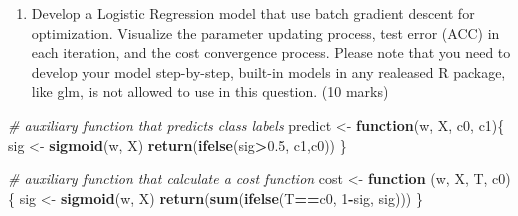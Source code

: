 \documentclass[
]{article}
\newenvironment{Shaded}{\begin{snugshade}}{\end{snugshade}}
\newcommand{\CommentTok}[1]{\textcolor[rgb]{0.56,0.35,0.01}{\textit{#1}}}
\newcommand{\ControlFlowTok}[1]{\textcolor[rgb]{0.13,0.29,0.53}{\textbf{#1}}}
\newcommand{\DecValTok}[1]{\textcolor[rgb]{0.00,0.00,0.81}{#1}}
\newcommand{\FloatTok}[1]{\textcolor[rgb]{0.00,0.00,0.81}{#1}}
\newcommand{\KeywordTok}[1]{\textcolor[rgb]{0.13,0.29,0.53}{\textbf{#1}}}
\newcommand{\NormalTok}[1]{#1}
\newcommand{\OperatorTok}[1]{\textcolor[rgb]{0.81,0.36,0.00}{\textbf{#1}}}
\newcommand{\StringTok}[1]{\textcolor[rgb]{0.31,0.60,0.02}{#1}}
\providecommand{\tightlist}{%
  \setlength{\itemsep}{0pt}\setlength{\parskip}{0pt}}
\begin{document}
\begin{enumerate}
\def\labelenumi{\arabic{enumi}.}
\setcounter{enumi}{2}
\tightlist
\item
  Develop a Logistic Regression model that use batch gradient descent
  for optimization. Visualize the parameter updating process, test error
  (ACC) in each iteration, and the cost convergence process. Please note
  that you need to develop your model step-by-step, built-in models in
  any realeased R package, like glm, is not allowed to use in this
  question. (10 marks)
\end{enumerate}

\begin{Shaded}
\begin{Highlighting}[]
\CommentTok{# auxiliary function that predicts class labels}
\NormalTok{predict <-}\StringTok{ }\ControlFlowTok{function}\NormalTok{(w, X, c0, c1)\{}
\NormalTok{    sig <-}\StringTok{ }\KeywordTok{sigmoid}\NormalTok{(w, X)}
    \KeywordTok{return}\NormalTok{(}\KeywordTok{ifelse}\NormalTok{(sig}\OperatorTok{>}\FloatTok{0.5}\NormalTok{, c1,c0))}
\NormalTok{\}}
    
\CommentTok{# auxiliary function that calculate a cost function}
\NormalTok{cost <-}\StringTok{ }\ControlFlowTok{function}\NormalTok{ (w, X, T, c0)\{}
\NormalTok{    sig <-}\StringTok{ }\KeywordTok{sigmoid}\NormalTok{(w, X)}
    \KeywordTok{return}\NormalTok{(}\KeywordTok{sum}\NormalTok{(}\KeywordTok{ifelse}\NormalTok{(T}\OperatorTok{==}\NormalTok{c0, }\DecValTok{1}\OperatorTok{-}\NormalTok{sig, sig)))}
\NormalTok{\}}
\end{Highlighting}
\end{Shaded}

\begin{Shaded}
\end{Shaded}
\end{document}
